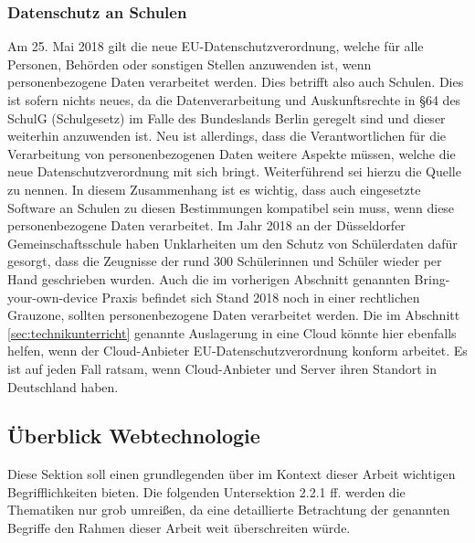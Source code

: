 \subsubsection{Datenschutz an Schulen}\label{sec:datenschutz}
Am 25. Mai 2018 gilt die neue EU-Datenschutzverordnung, welche für alle Personen, Behörden oder sonstigen Stellen anzuwenden ist, wenn personenbezogene Daten verarbeitet werden. Dies betrifft also auch Schulen. Dies ist sofern nichts neues, da die Datenverarbeitung und Auskunftsrechte in §64 des SchulG (Schulgesetz) im Falle des Bundeslands Berlin geregelt sind und dieser weiterhin anzuwenden ist. Neu ist allerdings, dass die Verantwortlichen für die Verarbeitung von personenbezogenen Daten weitere Aspekte müssen, welche die neue Datenschutzverordnung mit sich bringt. Weiterführend sei hierzu die Quelle \cite[Datenschutz in der Schule]{Kachelriess2019} zu nennen. In diesem Zusammenhang ist es wichtig, dass auch eingesetzte Software an Schulen zu diesen Bestimmungen kompatibel sein muss, wenn diese personenbezogene Daten verarbeitet. Im Jahr 2018 an der Düsseldorfer Gemeinschaftsschule haben Unklarheiten um den Schutz von Schülerdaten dafür gesorgt, dass die Zeugnisse der rund 300 Schülerinnen und Schüler wieder per Hand geschrieben wurden. Auch die im vorherigen Abschnitt genannten Bring-your-own-device Praxis befindet sich Stand 2018 noch in einer rechtlichen Grauzone, sollten personenbezogene Daten verarbeitet werden\cite{WitmerGossner2018}. Die im Abschnitt \ref{sec:technikunterricht} genannte Auslagerung in eine Cloud könnte hier ebenfalls helfen, wenn der Cloud-Anbieter EU-Datenschutzverordnung konform arbeitet. Es ist auf jeden Fall ratsam, wenn Cloud-Anbieter und Server ihren Standort in Deutschland haben.



\subsection{Überblick Webtechnologie}\label{sec:webbasedsoftware}
Diese Sektion soll einen grundlegenden über im Kontext dieser Arbeit wichtigen Begrifflichkeiten bieten. Die folgenden Untersektion 2.2.1 ff. werden die Thematiken nur grob umreißen, da eine detaillierte Betrachtung der genannten Begriffe den Rahmen dieser Arbeit weit überschreiten würde. 


